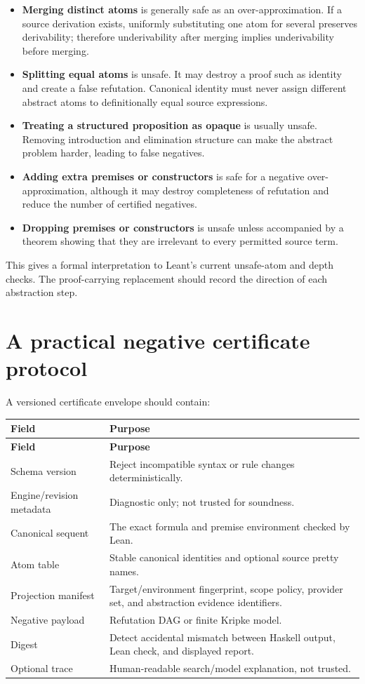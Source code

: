 \documentclass[11pt,letterpaper,openany]{report}
\theoremstyle{definition}
\theoremstyle{remark}
\begin{document}
\begin{itemize}
\item \textbf{Merging distinct atoms} is generally safe as an over-approximation. If a source derivation exists, uniformly substituting one atom for several preserves derivability; therefore underivability after merging implies underivability before merging.
\item \textbf{Splitting equal atoms} is unsafe. It may destroy a proof such as identity and create a false refutation. Canonical identity must never assign different abstract atoms to definitionally equal source expressions.
\item \textbf{Treating a structured proposition as opaque} is usually unsafe. Removing introduction and elimination structure can make the abstract problem harder, leading to false negatives.
\item \textbf{Adding extra premises or constructors} is safe for a negative over-approximation, although it may destroy completeness of refutation and reduce the number of certified negatives.
\item \textbf{Dropping premises or constructors} is unsafe unless accompanied by a theorem showing that they are irrelevant to every permitted source term.
\end{itemize}

This gives a formal interpretation to Leant's current unsafe-atom and depth checks. The proof-carrying replacement should record the direction of each abstraction step.

\section{A practical negative certificate protocol}

A versioned certificate envelope should contain:

\begin{longtable}{L{0.24\textwidth} L{0.68\textwidth}}
\toprule
\textbf{Field} & \textbf{Purpose} \\
\midrule
\endfirsthead
\toprule
\textbf{Field} & \textbf{Purpose} \\
\midrule
\endhead
Schema version & Reject incompatible syntax or rule changes deterministically. \\
Engine/revision metadata & Diagnostic only; not trusted for soundness. \\
Canonical sequent & The exact formula and premise environment checked by Lean. \\
Atom table & Stable canonical identities and optional source pretty names. \\
Projection manifest & Target/environment fingerprint, scope policy, provider set, and abstraction evidence identifiers. \\
Negative payload & Refutation DAG or finite Kripke model. \\
Digest & Detect accidental mismatch between Haskell output, Lean check, and displayed report. \\
Optional trace & Human-readable search/model explanation, not trusted. \\
\bottomrule
\end{longtable}
\end{document}
